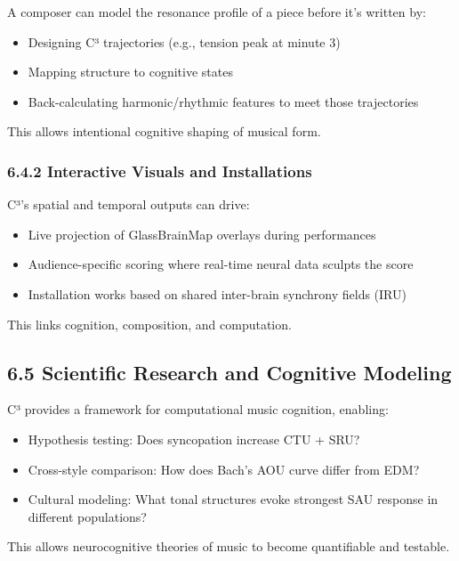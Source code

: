 \documentclass[10pt]{article}
\begin{document}
A composer can model the resonance profile of a piece before it's written by:

\begin{itemize}
    \item Designing C³ trajectories (e.g., tension peak at minute 3)
    \item Mapping structure to cognitive states
    \item Back-calculating harmonic/rhythmic features to meet those trajectories
\end{itemize}

This allows intentional cognitive shaping of musical form.

\subsubsection*{6.4.2 Interactive Visuals and Installations}

C³’s spatial and temporal outputs can drive:

\begin{itemize}
    \item Live projection of GlassBrainMap overlays during performances
    \item Audience-specific scoring where real-time neural data sculpts the score
    \item Installation works based on shared inter-brain synchrony fields (IRU)
\end{itemize}

This links cognition, composition, and computation.

\subsection*{6.5 Scientific Research and Cognitive Modeling}

C³ provides a framework for computational music cognition, enabling:

\begin{itemize}
    \item Hypothesis testing: Does syncopation increase CTU + SRU?
    \item Cross-style comparison: How does Bach’s AOU curve differ from EDM?
    \item Cultural modeling: What tonal structures evoke strongest SAU response in different populations?
\end{itemize}

This allows neurocognitive theories of music to become quantifiable and testable.
\end{document}
